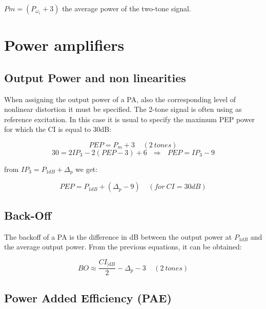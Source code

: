  $Pm =(P_{\omega_1}+3)$ the average power of the two-tone signal.


\section{Power amplifiers} %
\label{sec:power_amplifiers}


\subsection{Output Power and non linearities} %
\label{sub:output_power_and_non_linearities}

When assigning the output power of a PA, also the corresponding level of
nonlinear distortion it must be specified.
The 2-tone signal is often using as reference excitation. In this case it is
usual to specify the maximum PEP power for which the CI is equal to 30dB:


\begin{equation}
	PEP = P_m +3  \ \ \ \ \ (2 \ tones) 
	\end{equation}
\begin{equation}
	30= 2IP_3-2(PEP-3)+6 \ \ \ \Longrightarrow \ \ \ PEP= IP_3-9 
\end{equation}

from $IP_3=P_{1dB}+\Delta_p$ we get:

\begin{equation}
	PEP= P_{1dB} + (\Delta_p -9 )   \ \ \ \ \ (for \  CI=30dB)
\end{equation}


\subsection{Back-Off} %
\label{sub:back_off}

The backoff of a PA is the difference in dB between the output power at $P_{1dB}$ and the average output power. From the previous equations, it can be obtained:

\begin{equation}
	BO\approx \frac{CI_{|dB}}{2}-\Delta_p-3 \ \ \ \ \ (2  \ tones)
\end{equation}


\subsection{Power Added Efficiency (PAE)} %
\label{sub:power_added_efficiency}


